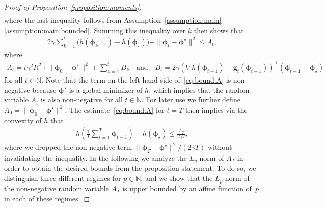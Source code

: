 \documentclass[11pt, a4paper, oneside, reqno]{article}
\begin{document}
\begin{proof}[Proof of Proposition~\ref{proposition:moments}]
\begin{align*}
		\end{align*}
		where the last inequality follows from Assumption~\ref{assumption:main}\,\ref{assumption:main:bounded}.
		Summing this inequality over $k$ then shows that
		\begin{align}
		\label{eq:bound:A}
		    2 \gamma \sum_{k=1}^t \big( h ( \bm \phi_{k-1}) - h(\bm \phi_{\star}) \big) + \| \bm \phi_{t} - \bm \phi^\star \|^2 \leq A_t,
		\end{align}
		where
		\begin{align*}
		    A_t = t \gamma^2 R^2 + \| \bm \phi_{0} - \bm \phi^\star \|^2 + \sum_{k=1}^t B_k \quad \text{and} \quad B_t = 2 \gamma \left( \nabla h(\bm \phi_{t-1}) - \bm g_t(\bm \phi_{t-1}) \right)^\top (\bm \phi_{t-1} - \bm \phi_{\star})
		\end{align*}
		for all $t \in\mathbb N$. Note that the term on the left hand side of~\eqref{eq:bound:A} is non-negative because $\bm \phi^\star$ is a global minimizer of $h$, which implies that the random variable $A_t$ is also non-negative for all $t\in\mathbb N$. For later use we further define $A_0 = \| \bm \phi_{0} - \bm \phi^\star \|^2$. The estimate~\eqref{eq:bound:A} for $t=T$ then implies via the convexity of $h$ that
		\begin{align}
		\label{eq:bound:A:convexity}
		    h \left( \frac{1}{T} \sum_{t=1}^T \bm \phi_{t-1} \right) - h(\bm \phi_{\star})
		    \leq \frac{A_T}{2 \gamma T },
		\end{align}
		where we dropped the non-negative term $\|\bm \phi_T-\bm \phi^\star\|^2/(2\gamma T)$ without invalidating the inequality. In the following we analyze the $L_p$-norm of $A_T$ in order to obtain the desired bounds from the proposition statement. To do so, we distinguish three different regimes for $p \in \mathbb N$, and we show that the $L_p$-norm of the non-negative random variable $A_T$ is upper bounded by an affine function of~$p$ in each of these regimes. 
		
		
		

\end{proof}
\end{document}
